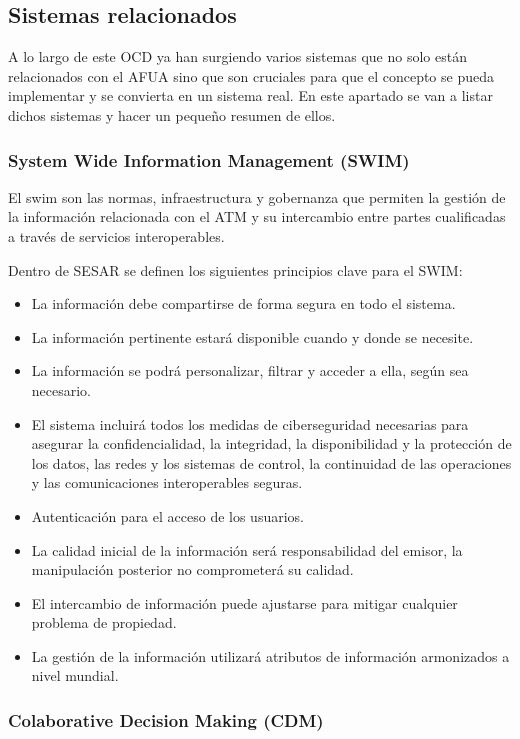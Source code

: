 \subsection{Sistemas relacionados}

A lo largo de este OCD ya han surgiendo varios sistemas que no solo están relacionados con el AFUA sino que son cruciales para que el concepto se pueda implementar y se convierta en un sistema real. En este apartado se van a listar dichos sistemas y hacer un pequeño resumen de ellos.

\subsubsection{System Wide Information Management (SWIM)}

El \acrfull{swim} son las normas, infraestructura y gobernanza que permiten la gestión de la información relacionada con el ATM y su intercambio entre partes cualificadas a través de servicios interoperables.

Dentro de SESAR se definen los siguientes principios clave  para el SWIM:

\begin{itemize}
    \item La información debe compartirse de forma segura en todo el sistema.
    \item La información pertinente estará disponible cuando y donde se necesite.
    \item La información se podrá personalizar, filtrar y acceder a ella, según sea necesario.
    \item El sistema incluirá todos los medidas de ciberseguridad necesarias para asegurar la confidencialidad, la integridad, la disponibilidad y la protección de los datos, las redes y los sistemas de control, la continuidad de las operaciones y las comunicaciones interoperables seguras.
    \item Autenticación para el acceso de los usuarios.
    \item La calidad inicial de la información será responsabilidad del emisor, la manipulación posterior no comprometerá su calidad.
    \item El intercambio de información puede ajustarse para mitigar cualquier problema de propiedad.
    \item La gestión de la información utilizará atributos de información armonizados a nivel mundial.
\end{itemize}

\subsubsection{Colaborative Decision Making (CDM)}

